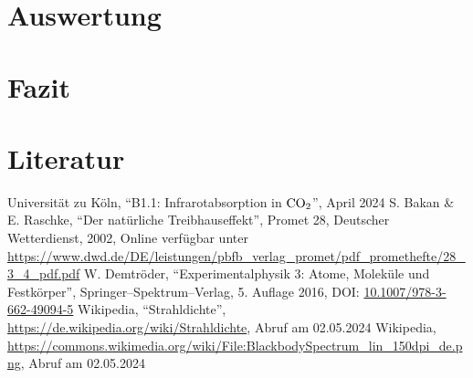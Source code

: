 \documentclass[12pt,a4paper]{scrartcl}
\numberwithin{equation}{section} %
\renewcommand{\[}{} %
\renewcommand{\]}{\noindent} %
\begin{document}
\clearpage
\hypertarget{auswertung}{%
\section{Auswertung}\label{auswertung}}

\clearpage
\hypertarget{fazit}{%
\section{Fazit}\label{fazit}}

\clearpage
\hypertarget{literatur}{%
\section{Literatur}\label{literatur}}
\renewcommand{\section}[2]{} %
\begin{thebibliography}{9}
	Universität zu Köln, ``B1.1: Infrarotabsorption in \(\ce{CO_2}\)'', April 2024
  S. Bakan \& E. Raschke, ``Der natürliche Treibhauseffekt'', Promet 28,
	Deutscher Wetterdienst, 2002, Online verfügbar unter
	\url{https://www.dwd.de/DE/leistungen/pbfb_verlag_promet/pdf_promethefte/28_3_4_pdf.pdf}
	W. Demtröder, ``Experimentalphysik 3: Atome, Moleküle und Festkörper'',
	Springer--Spektrum--Verlag, 5. Auflage 2016, DOI:
	\href{https://doi.org/10.1007/978-3-662-49094-5}{10.1007/978-3-662-49094-5}
	Wikipedia, ``Strahldichte'',
	\url{https://de.wikipedia.org/wiki/Strahldichte}, Abruf am 02.05.2024
	Wikipedia, \url{https://commons.wikimedia.org/wiki/File:BlackbodySpectrum_lin_150dpi_de.png},
	Abruf am 02.05.2024
\end{thebibliography}
\end{document}
